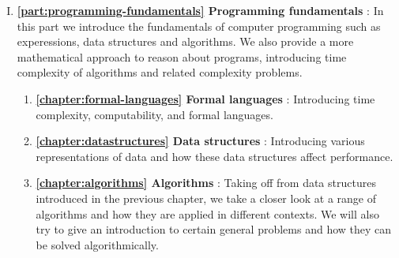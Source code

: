 \begin{enumerate}[I.]
	\item \textbf{\autoref{part:programming-fundamentals} Programming fundamentals} : In this part we introduce the fundamentals of computer programming such as experessions, data structures and algorithms. We also provide a more mathematical approach to reason about programs, introducing time complexity of algorithms and related complexity problems.
		\begin{enumerate}[1.]
			\item \textbf{\autoref{chapter:formal-languages} Formal languages} : Introducing time complexity, computability, and formal languages.
			\item \textbf{\autoref{chapter:datastructures} Data structures} : Introducing various representations of data and how these data structures affect performance.
			\item \textbf{\autoref{chapter:algorithms} Algorithms} : Taking off from data structures introduced in the previous chapter, we take a closer look at a range of algorithms and how they are applied in different contexts. We will also try to give an introduction to certain general problems and how they can be solved algorithmically.
		\end{enumerate}




\end{enumerate}
